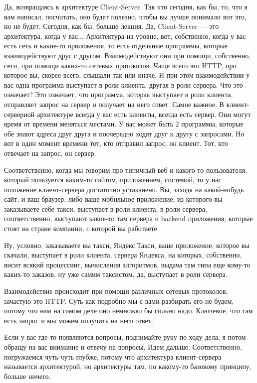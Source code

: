 \documentclass[12pt]{article} %
\begin{document}
Да, возвращаясь к архитектуре Client-Server.  Так что сегодня, как бы, то, что я вам написал, посчитать, оно будет полезно, чтобы вы лучше понимали вот это, но не будет. Сегодня, как бы, больше лекция.  Да, Client-Server — это архитектура, когда у вас...  Архитектура на уровне, вот, собственно, когда у вас есть сеть и какие-то приложения, то есть отдельные программы, которые взаимодействуют друг с другом.  Взаимодействуют они при помощи, собственно, сети, при помощи каких-то сетевых протоколов.  Чаще всего это HTTP, про которое вы, скорее всего, слышали так или иначе.  И при этом взаимодействии у вас одна программа выступает в роли клиента, другая в роли сервера.  Что это означает? Это означает, что программа, которая выступает в роли клиента, отправляет запрос на сервер и получает на него ответ.  Самое важное. В клиент-серверной архитектуре всегда у вас есть клиенты, всегда есть сервер.  Они могут время от времени меняться местами. У вас может быть 2 программы, которые обе знают адреса друг друга и поочередно ходят друг к другу с запросами. Но вот в один момент времени тот, кто отправил запрос, он клиент.  Тот, кто отвечает на запрос, он сервер.  

Соответственно, когда мы говорим про типичный веб и какого-то пользователя, который пользуется каким-то сайтом, приложением, системой, то у нас положение клиент-сервера достаточно устаканено.  Вы, заходя на какой-нибудь сайт, и ваш браузер, либо ваше мобильное приложение, из которого вы заказываете себе такси, выступает в роли клиента, в роли сервера, соответственно, выступают какие-то там сервера и backend приложения, которые стоят на стране компании, с которой вы работаете.

Ну, условно, заказываете вы такси, Яндекс.Такси, ваше приложение, которое вы скачали, выступает в роли клиента,  сервера Яндекса, на которых, собственно, висит всякий процессинг, вычисления алгоритмов, выдача там типа еще кому-то каких-то заказов, ну уже самим таксистом, да, выступает в роли сервера. 

Взаимодействие происходит при помощи различных сетевых протоколов, зачастую это HTTP.  Суть как подробно мы с вами разбирать его не будем, потому что нам на самом деле оно немножко бы сильно надо.  Ключевое, что там есть запрос и мы можем получить на него ответ.  

Если у вас где-то появляются вопросы, поднимайте руку по ходу дела, я потом обращу на вас внимание и отвечу на вопросы.  Идем дальше. Соответственно, погружаемся чуть-чуть глубже, потому что архитектура клиент-сервера называется архитектурой, но архитектуры там, по какому-то базовому принципу, больше ничего.  
\end{document}
